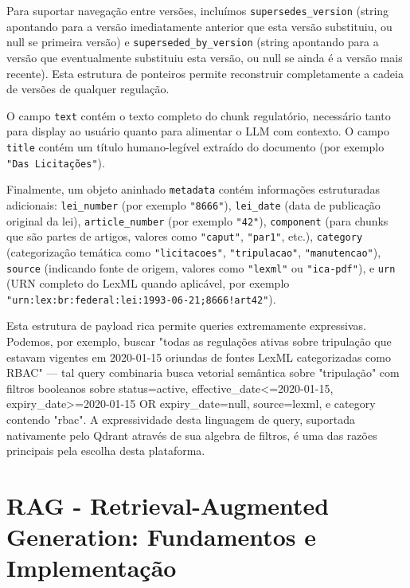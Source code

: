 \documentclass[12pt,a4paper]{article}
\begin{document}
Para suportar navegação entre versões, incluímos \texttt{supersedes\_version} (string apontando para a versão imediatamente anterior que esta versão substituiu, ou null se primeira versão) e \texttt{superseded\_by\_version} (string apontando para a versão que eventualmente substituiu esta versão, ou null se ainda é a versão mais recente). Esta estrutura de ponteiros permite reconstruir completamente a cadeia de versões de qualquer regulação.

O campo \texttt{text} contém o texto completo do chunk regulatório, necessário tanto para display ao usuário quanto para alimentar o LLM com contexto. O campo \texttt{title} contém um título humano-legível extraído do documento (por exemplo \texttt{"Das Licitações"}).

Finalmente, um objeto aninhado \texttt{metadata} contém informações estruturadas adicionais: \texttt{lei\_number} (por exemplo \texttt{"8666"}), \texttt{lei\_date} (data de publicação original da lei), \texttt{article\_number} (por exemplo \texttt{"42"}), \texttt{component} (para chunks que são partes de artigos, valores como \texttt{"caput"}, \texttt{"par1"}, etc.), \texttt{category} (categorização temática como \texttt{"licitacoes"}, \texttt{"tripulacao"}, \texttt{"manutencao"}), \texttt{source} (indicando fonte de origem, valores como \texttt{"lexml"} ou \texttt{"ica-pdf"}), e \texttt{urn} (URN completo do LexML quando aplicável, por exemplo \texttt{"urn:lex:br:federal:lei:1993-06-21;8666!art42"}).

Esta estrutura de payload rica permite queries extremamente expressivas. Podemos, por exemplo, buscar "todas as regulações ativas sobre tripulação que estavam vigentes em 2020-01-15 oriundas de fontes LexML categorizadas como RBAC" — tal query combinaria busca vetorial semântica sobre "tripulação" com filtros booleanos sobre status=active, effective\_date<=2020-01-15, expiry\_date>=2020-01-15 OR expiry\_date=null, source=lexml, e category contendo "rbac". A expressividade desta linguagem de query, suportada nativamente pelo Qdrant através de sua algebra de filtros, é uma das razões principais pela escolha desta plataforma.

\section{RAG - Retrieval-Augmented Generation: Fundamentos e Implementação}
\end{document}
